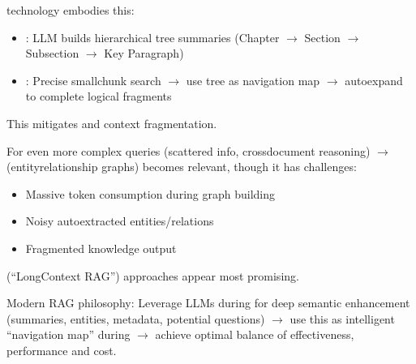 \documentclass[letterpaper,10pt,english]{sphinxmanual}
\begin{document}
\begin{figure}[htbp]
\centering

\noindent{}
\end{figure}

\sphinxAtStartPar
{} technology embodies this:
\begin{itemize}
\item {} 
\sphinxAtStartPar
{}: LLM builds hierarchical tree summaries (Chapter \(\rightarrow\)
Section \(\rightarrow\) Subsection \(\rightarrow\) Key Paragraph)

\item {} 
\sphinxAtStartPar
{}: Precise small\sphinxhyphen{}chunk search \(\rightarrow\) use tree as navigation map \(\rightarrow\)
auto\sphinxhyphen{}expand to complete logical fragments

\end{itemize}

\sphinxAtStartPar
This mitigates  and context fragmentation.

\sphinxAtStartPar
For even more complex queries (scattered info, cross\sphinxhyphen{}document reasoning)
\(\rightarrow\)  (entity\sphinxhyphen{}relationship graphs) becomes relevant, though it
has challenges:
\begin{itemize}
\item {} 
\sphinxAtStartPar
Massive token consumption during graph building

\item {} 
\sphinxAtStartPar
Noisy auto\sphinxhyphen{}extracted entities/relations

\item {} 
\sphinxAtStartPar
Fragmented knowledge output

\end{itemize}

\sphinxAtStartPar
{} (“Long\sphinxhyphen{}Context RAG”) approaches appear
most promising.

\sphinxAtStartPar
Modern RAG philosophy: Leverage LLMs during  for deep
semantic enhancement (summaries, entities, metadata, potential
questions) \(\rightarrow\) use this as intelligent “navigation map” during
 \(\rightarrow\) achieve optimal balance of effectiveness, performance
and cost.
\end{document}

